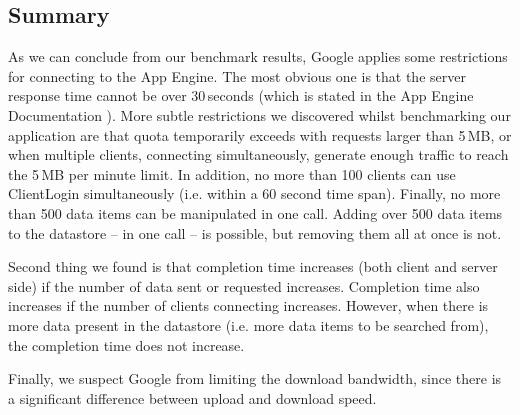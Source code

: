 \subsection{Summary}
As we can conclude from our benchmark results, Google applies some restrictions
for connecting to the App Engine. The most obvious one is that the
server response time cannot be over 30\,seconds (which is stated in the App
Engine Documentation \cite{app-engine-quotas}). More subtle restrictions we
discovered whilst benchmarking our application are that quota temporarily exceeds
with requests larger than 5\,MB, or when multiple clients, connecting
simultaneously, generate enough traffic to reach the 5\,MB per minute limit.
In addition, no more than 100 clients can use ClientLogin simultaneously (i.e.
within a 60 second time span). Finally, no more than 500 data items can be
manipulated in one call. Adding over 500 data items to the datastore -- in one
call -- is possible, but removing them all at once is not.

Second thing we found is that completion time increases (both client and server
side) if the number of data sent or requested increases. Completion time also
increases if the number of clients connecting increases. However, when there is
more data present in the datastore (i.e. more data items to be searched from),
the completion time does not increase.

Finally, we suspect Google from limiting the download bandwidth, since there is
a significant difference between upload and download speed.
